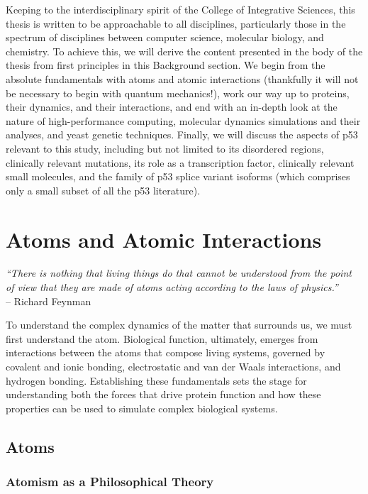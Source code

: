 Keeping to the interdisciplinary spirit of the College of Integrative Sciences, this thesis is written to be approachable to all disciplines, particularly those in the spectrum of disciplines between computer science, molecular biology, and chemistry. To achieve this, we will derive the content presented in the body of the thesis from first principles in this Background section. We begin from the absolute fundamentals with atoms and atomic interactions (thankfully it will not be necessary to begin with quantum mechanics!), work our way up to proteins, their dynamics, and their interactions, and end with an in-depth look at the nature of high-performance computing, molecular dynamics simulations and their analyses, and yeast genetic techniques. Finally, we will discuss the aspects of p53 relevant to this study, including but not limited to its disordered regions, clinically relevant mutations, its role as a transcription factor, clinically relevant small molecules, and the family of p53 splice variant isoforms (which comprises only a small subset of all the p53 literature).

\section{Atoms and Atomic Interactions}

\begin{flushright}
	\textit{“There is nothing that living things do that cannot be understood from the point of view that they are made of atoms acting according to the laws of physics.”}\\
– Richard Feynman\\
\hfill\break
\end{flushright}

To understand the complex dynamics of the matter that surrounds us, we must first understand the atom. Biological function, ultimately, emerges from interactions between the atoms that compose living systems, governed by covalent and ionic bonding, electrostatic and van der Waals interactions, and hydrogen bonding. Establishing these fundamentals sets the stage for understanding both the forces that drive protein function and how these properties can be used to simulate complex biological systems.

\subsection{Atoms}

\subsubsection{Atomism as a Philosophical Theory}

